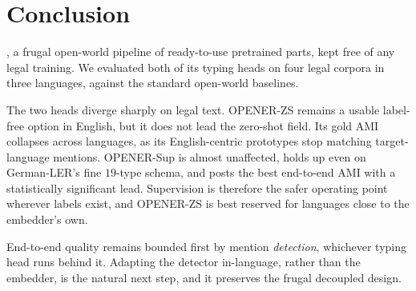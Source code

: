 \section{Conclusion}
\label{sec:conclusion}

, a frugal open-world pipeline of ready-to-use pretrained parts, kept free of any legal training. We evaluated both of its typing heads on four legal corpora in three languages, against the standard open-world baselines.

The two heads diverge sharply on legal text. OPENER-ZS remains a usable label-free option in English, but it does not lead the zero-shot field. Its gold AMI collapses across languages, as its English-centric prototypes stop matching target-language mentions. OPENER-Sup is almost unaffected, holds up even on German-LER's fine $19$-type schema, and posts the best end-to-end AMI with a statistically significant lead.  Supervision is therefore the safer operating point wherever labels exist, and OPENER-ZS is best reserved for languages close to the embedder's own.

End-to-end quality remains bounded first by mention \emph{detection}, whichever typing head runs behind it.  Adapting the detector in-language, rather than the embedder, is the natural next step, and it preserves the frugal decoupled design. 

